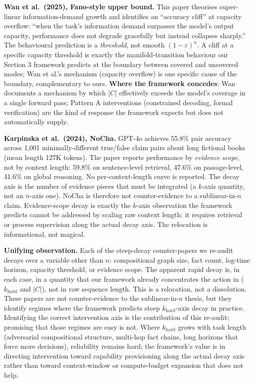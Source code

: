 \documentclass[
]{article}
\begin{document}
\textbf{Wan et al.~(2025), Fano-style upper bound.} This paper theorises
super-linear information-demand growth and identifies an ``accuracy
cliff'' at capacity overflow: ``when the task's information demand
surpasses the model's output capacity, performance does not degrade
gracefully but instead collapses sharply.'' The behavioural prediction
is a \emph{threshold}, not smooth \((1 - \varepsilon)^n\). A cliff at a
specific capacity threshold is exactly the manifold-transition behaviour
our Section 3 framework predicts at the boundary between covered and
uncovered modes; Wan et al.'s mechanism (capacity overflow) is one
specific cause of the boundary, complementary to ours. \textbf{Where the
framework concedes}: Wan documents a mechanism by which \(|C|\)
effectively exceeds the model's coverage in a single forward pass;
Pattern A interventions (constrained decoding, formal verification) are
the kind of response the framework expects but does not automatically
supply.

\textbf{Karpinska et al.~(2024), NoCha.} GPT-4o achieves 55.8\% pair
accuracy across 1,001 minimally-different true/false claim pairs about
long fictional books (mean length 127K tokens). The paper reports
performance by \emph{evidence scope}, not by context length: 59.8\% on
sentence-level retrieval, 47.6\% on passage-level, 41.6\% on global
reasoning. No per-context-length curve is reported. The decay axis is
the number of evidence pieces that must be integrated (a \(k\)-axis
quantity, not an \(n\)-axis one). NoCha is therefore not
counter-evidence to a sublinear-in-\(n\) claim. Evidence-scope decay is
exactly the \(k\)-axis observation the framework predicts cannot be
addressed by scaling raw context length: it requires retrieval or
process supervision along the actual decay axis. The relocation is
informational, not magical.

\textbf{Unifying observation.} Each of the steep-decay counter-papers we
re-audit decays over a variable other than \(n\): compositional graph
size, fact count, log-time horizon, capacity threshold, or evidence
scope. The apparent rapid decay is, in each case, in a quantity that our
framework already concentrates the action in (\(k_{\text{hard}}\) and
\(|C|\)), not in raw sequence length. This is a relocation, not a
dissolution. These papers are not counter-evidence to the
sublinear-in-\(n\) thesis, but they identify regimes where the framework
predicts steep \(k_{\text{hard}}\)-axis decay in practice. Identifying
the correct intervention axis is the contribution of this re-audit;
promising that those regimes are easy is not. Where \(k_{\text{hard}}\)
grows with task length (adversarial compositional structure, multi-hop
fact chains, long horizons that force more decisions), reliability
remains hard; the framework's value is in directing intervention toward
capability provisioning along the actual decay axis rather than toward
context-window or compute-budget expansion that does not help.
\end{document}
